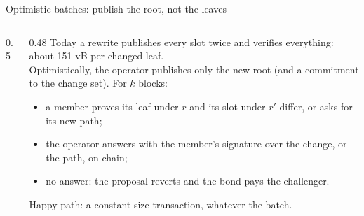 \documentclass[aspectratio=169,10pt]{beamer}
\begin{document}
\begin{frame}{Optimistic batches: publish the root, not the leaves}
  \\[0.4em]
  \begin{columns}[T]
    \begin{column}{0.5\textwidth}
    \end{column}
    \begin{column}{0.48\textwidth}
      \small
      Today a rewrite publishes every slot twice and verifies everything: about 151 vB per changed leaf.\\[0.4em]
      Optimistically, the operator publishes only the new root (and a commitment to the change set). For $k$ blocks:
      \begin{itemize}
        \item a member proves its leaf under $r$ and its slot under $r'$ differ, or asks for its new path;
        \item the operator answers with the member's signature over the change, or the path, on-chain;
        \item no answer: the proposal reverts and the bond pays the challenger.
      \end{itemize}
      Happy path: a constant-size transaction, whatever the batch.
    \end{column}
  \end{columns}
\end{frame}
\end{document}
